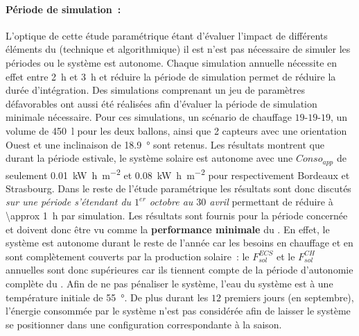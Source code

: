 \paragraph{Période de simulation~:} %
\label{par:periode_de_simulation}
L’optique de cette étude paramétrique étant d’évaluer l’impact de différents éléments du
 (technique et algorithmique) il est n’est pas nécessaire de simuler les périodes ou
le système est autonome. Chaque simulation annuelle nécessite en effet entre
\SI{2}{\hour} et \SI{3}{\hour} et réduire la période de simulation permet de réduire la durée
d’intégration. Des simulations comprenant un jeu de paramètres défavorables ont aussi été
réalisées afin d’évaluer la période de simulation minimale nécessaire. Pour ces
simulations, un scénario de chauffage $19$-$19$-$19$, un volume de \SI{450}{\litre} pour les
deux ballons, ainsi que \num{2} capteurs avec une orientation Ouest et une inclinaison de
\SI{18.9}{\degree} sont retenus. Les résultats montrent que durant la
période estivale, le système solaire est autonome avec une $Conso_{app}$ de seulement
\SI[per-mode=symbol]{0.01}{\kilo\watt\hour\per\metre\squared} et
\SI[per-mode=symbol]{0.08}{\kilo\watt\hour\per\metre\squared}
pour respectivement Bordeaux et Strasbourg. Dans le reste de l’étude paramétrique
les résultats sont donc discutés \emph{sur une période s’étendant du $1^{er}$
octobre au $30$ avril} permettant de réduire à \SI{\approx 1}{\hour} par simulation. Les
résultats sont fournis pour la période concernée et doivent donc être vu comme la
\textbf{performance minimale} du . En effet, le système est autonome durant le reste
de l’année car les besoins en chauffage et en  sont complètement couverts par la
production solaire~: le $F_{sol}^{ECS}$ et le $F_{sol}^{CH}$ annuelles sont donc
supérieures car ils tiennent compte de la période d’autonomie complète du .
Afin de ne pas pénaliser le système, l’eau du système est à une température
initiale de \SI{55}{\degree}. De plus durant les $12$ premiers jours (en septembre),
l’énergie consommée par le système n’est pas considérée afin de laisser le système
se positionner dans une configuration correspondante à la saison.




